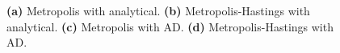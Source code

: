 \begin{figure}[!htb]
\qquad
{}
\caption{\textbf{(a)} Metropolis with analytical. \textbf{(b)} Metropolis-Hastings with analytical. \textbf{(c)} Metropolis with AD. \textbf{(d)} Metropolis-Hastings with AD.}
\label{fig:non-interact_boxplot}
\end{figure}

